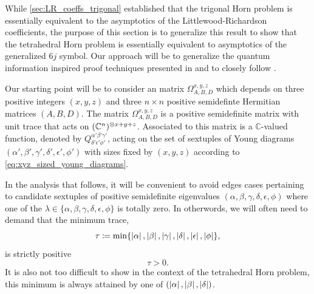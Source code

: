 \documentclass[notitlepage, 10pt]{article}
\begin{document}
While \cref{sec:LR_coeffs_trigonal} established that the trigonal Horn problem is essentially equivalent to the asymptotics of the Littlewood-Richardson coefficients, the purpose of this section is to generalize this result to show that the tetrahedral Horn problem is essentially equivalent to asymptotics of the generalized $6j$ symbol.
Our approach will be to generalize the quantum information inspired proof techniques presented in \cite{christandl2008quantum} and to closely follow \cite{christandl2018recoupling}.

Our starting point will be to consider an matrix $\Omega_{A,B,D}^{x,y,z}$ which depends on three positive integers $(x,y,z)$ and three $n\times n$ positive semidefinte Hermitian matrices $(A,B,D)$.
The matrix $\Omega_{A,B,D}^{x,y,z}$ is a positive semidefinite matrix with unit trace that acts on $(\mathbb C^{n})^{\otimes x+y+z}$.
Associated to this matrix is a $\mathbb C$-valued function, denoted by $Q^{\alpha'\beta'\gamma'}_{\delta'\epsilon'\phi'}$, acting on the set of sextuples of Young diagrams $(\alpha',\beta',\gamma',\delta',\epsilon',\phi')$ with sizes fixed by $(x,y,z)$ according to \cref{eq:xyz_sized_young_diagrams}.

\begin{rem}
    In the analysis that follows, it will be convenient to avoid edges cases pertaining to candidate sextuples of positive semidefinite eigenvalues $(\alpha,\beta,\gamma,\delta,\epsilon,\phi)$ where one of the $\lambda \in \{\alpha,\beta,\gamma,\delta,\epsilon,\phi\}$ is totally zero.
    In otherwords, we will often need to demand that the minimum trace,
    \begin{equation}
        \tau \coloneqq \min\{ \left|\alpha\right|, \left|\beta\right|, \left|\gamma\right|, \left|\delta\right|, \left|\epsilon\right|, \left|\phi\right|\},
    \end{equation}
    is strictly positive 
    \begin{equation}
        \tau > 0.
    \end{equation}
    It is also not too difficult to show in the context of the tetrahedral Horn problem, this minimum is always attained by one of $(\left|\alpha\right|, \left|\beta\right|, \left|\delta\right|)$.
\end{rem}
\end{document}
